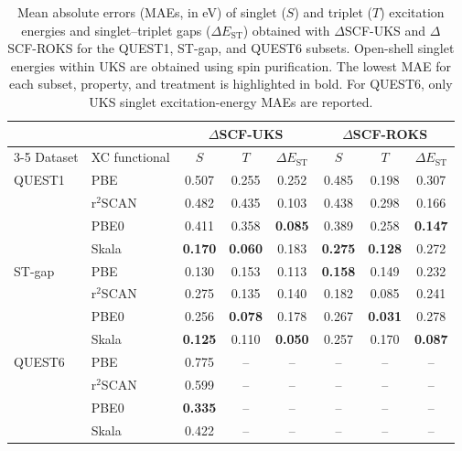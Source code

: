 \begin{table}[t!]
\caption{\label{tab:mae_summary}
Mean absolute errors (MAEs, in eV) of singlet ($S$) and triplet ($T$)
excitation energies and singlet--triplet gaps ($\Delta E_{\mathrm{ST}}$)
obtained with $\Delta$SCF-UKS and $\Delta$SCF-ROKS for the QUEST1, ST-gap, and QUEST6 subsets.
Open-shell singlet energies within UKS are obtained using spin purification.
The lowest MAE for each subset, property, and treatment is highlighted in bold.
For QUEST6, only UKS singlet excitation-energy MAEs are reported.
}
\begin{ruledtabular}
\begin{tabular}{llcccccc}
 & & \multicolumn{3}{c}{$\Delta$SCF-UKS} & \multicolumn{3}{c}{$\Delta$SCF-ROKS} \\
\cline{3-5}\cline{6-8}
Dataset & XC functional & $S$ & $T$ & $\Delta E_{\mathrm{ST}}$ & $S$ & $T$ & $\Delta E_{\mathrm{ST}}$ \\
\hline
QUEST1 & PBE & 0.507 & 0.255 & 0.252 & 0.485 & 0.198 & 0.307 \\
 & r$^2$SCAN & 0.482 & 0.435 & 0.103 & 0.438 & 0.298 & 0.166 \\
 & PBE0 & 0.411 & 0.358 & \textbf{0.085} & 0.389 & 0.258 & \textbf{0.147} \\
 & Skala & \textbf{0.170} & \textbf{0.060} & 0.183 & \textbf{0.275} & \textbf{0.128} & 0.272 \\
\hline
ST-gap & PBE & 0.130 & 0.153 & 0.113 & \textbf{0.158} & 0.149 & 0.232 \\
 & r$^2$SCAN & 0.275 & 0.135 & 0.140 & 0.182 & 0.085 & 0.241 \\
 & PBE0 & 0.256 & \textbf{0.078} & 0.178 & 0.267 & \textbf{0.031} & 0.278 \\
 & Skala & \textbf{0.125} & 0.110 & \textbf{0.050} & 0.257 & 0.170 & \textbf{0.087} \\
\hline
QUEST6 & PBE & 0.775 & -- & -- & -- & -- & -- \\
 & r$^2$SCAN & 0.599 & -- & -- & -- & -- & -- \\
 & PBE0 & \textbf{0.335} & -- & -- & -- & -- & -- \\
 & Skala & 0.422 & -- & -- & -- & -- & -- \\
\end{tabular}
\end{ruledtabular}
\end{table}
